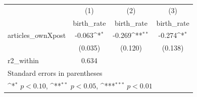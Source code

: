 {
\def\sym#1{\ifmmode^{#1}\else\(^{#1}\)\fi}
\begin{tabular}{l*{3}{c}}
\hline\hline
            &\multicolumn{1}{c}{(1)}&\multicolumn{1}{c}{(2)}&\multicolumn{1}{c}{(3)}\\
            &\multicolumn{1}{c}{birth\_rate}&\multicolumn{1}{c}{birth\_rate}&\multicolumn{1}{c}{birth\_rate}\\
\hline
articles\_ownXpost&      -0.063\sym{*}  &      -0.269\sym{**} &      -0.274\sym{*}  \\
            &     (0.035)         &     (0.120)         &     (0.138)         \\
\hline
r2\_within   &       0.634         &                     &                     \\
\hline\hline
\multicolumn{4}{l}{\footnotesize Standard errors in parentheses}\\
\multicolumn{4}{l}{\footnotesize \sym{*} \(p<0.10\), \sym{**} \(p<0.05\), \sym{***} \(p<0.01\)}\\
\end{tabular}
}
